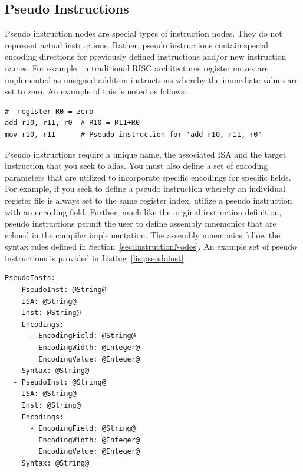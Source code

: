 \documentclass{article}
\begin{document}
\clearpage
\subsection{Pseudo Instructions}
\label{sec:PseudoInstructionNodes}

Pseudo instruction nodes are special types of instruction nodes.  They do not represent actual instructions.  Rather, 
pseudo instructions contain special encoding directions for previously defined instructions and/or new instruction names.  
For example, in traditional RISC architectures register moves are implemented as unsigned addition instructions whereby 
the immediate values are set to zero.  An example of this is noted as follows: 

\vspace{0.125in}
\begin{verbatim}
#  register R0 = zero
add r10, r11, r0  # R10 = R11+R0
mov r10, r11      # Pseudo instruction for 'add r10, r11, r0'
\end{verbatim}

Pseudo instructions require a unique name, the associated ISA and the target instruction that you seek to alias.  
You must also define a set of encoding parameters that are utilized to incorporate specific encodings for specific fields.  
For example, if you seek to define a pseudo instruction whereby an individual register file is always set to the same 
register index, utilize a pseudo instruction with an encoding field.  Further, much like the original instruction definition, pseudo 
instructions permit the user to define assembly mnemonics that are echoed in the compiler implementation.  The assembly 
mnemonics follow the syntax rules defined in Section~\ref{sec:InstructionNodes}.  An example set of pseudo instructions is provided 
in Listing~\ref{lis:pseudoinst}.  

\vspace{0.125in}
\begin{lstlisting}[frame=single,style=base,caption={Pseudo Instruction Node Definition},captionpos=b,label={lis:pseudoinst}]
PseudoInsts:
  - PseudoInst: @String@
    ISA: @String@
    Inst: @String@
    Encodings:
      - EncodingField: @String@
        EncodingWidth: @Integer@
        EncodingValue: @Integer@
    Syntax: @String@
  - PseudoInst: @String@
    ISA: @String@
    Inst: @String@
    Encodings:
      - EncodingField: @String@
        EncodingWidth: @Integer@
        EncodingValue: @Integer@
    Syntax: @String@
\end{lstlisting}
\end{document}
